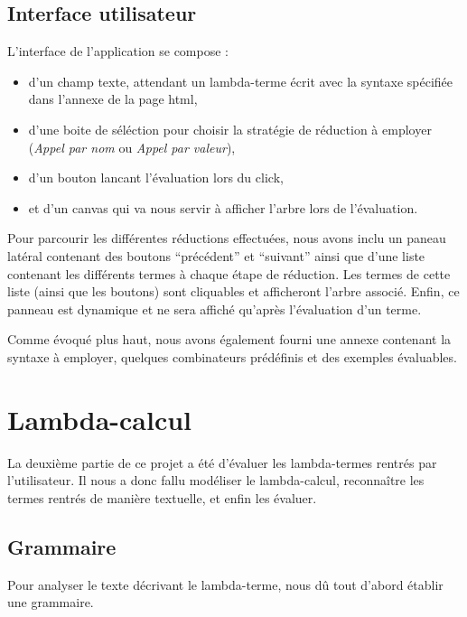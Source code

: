 \documentclass[11pt,a4paper]{report}
\begin{document}
\section{Interface utilisateur}

L'interface de l'application se compose : 
\begin{itemize}

\item d'un champ texte, attendant un lambda-terme écrit avec la
  syntaxe spécifiée dans l'annexe de la page html,

\item d'une boite de séléction pour choisir la stratégie de réduction
  à employer (\emph{Appel par nom} ou \emph{Appel par valeur}),

\item d'un bouton lancant l'évaluation lors du click,

\item et d'un canvas qui va nous servir à afficher l'arbre lors de
  l'évaluation.
\end{itemize}

Pour parcourir les différentes réductions effectuées, nous avons inclu
un paneau latéral contenant des boutons ``précédent'' et ``suivant''
ainsi que d'une liste contenant les différents termes à chaque étape
de réduction. Les termes de cette liste (ainsi que les boutons) sont
cliquables et afficheront l'arbre associé. Enfin, ce panneau est
dynamique et ne sera affiché qu'après l'évaluation d'un terme.

Comme évoqué plus haut, nous avons également fourni une annexe
contenant la syntaxe à employer, quelques combinateurs prédéfinis
et des exemples évaluables.


\chapter{Lambda-calcul}

La deuxième partie de ce projet a été d'évaluer les lambda-termes rentrés par l'utilisateur. Il nous a donc fallu modéliser le lambda-calcul, reconnaître les termes rentrés de manière textuelle, et enfin les évaluer.

\section{Grammaire}
\bigskip
Pour analyser le texte décrivant le lambda-terme, nous dû tout d'abord établir une grammaire.

\medskip
\end{document}
